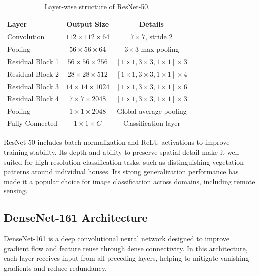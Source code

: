 \begin{table}[ht]
    \centering
    \renewcommand{\arraystretch}{1.3}
    \setlength{\tabcolsep}{10pt}
    \begin{tabular}{lcc}
        \toprule
        \textbf{Layer} & \textbf{Output Size} & \textbf{Details} \\ 
        \midrule
        Convolution      & $112 \times 112 \times 64$  & $7 \times 7$, stride 2 \\
        Pooling          & $56 \times 56 \times 64$   & $3 \times 3$ max pooling \\
        Residual Block 1 & $56 \times 56 \times 256$  & $\left[1\times1, 3\times3, 1\times1\right] \times 3$ \\
        Residual Block 2 & $28 \times 28 \times 512$  & $\left[1\times1, 3\times3, 1\times1\right] \times 4$ \\
        Residual Block 3 & $14 \times 14 \times 1024$ & $\left[1\times1, 3\times3, 1\times1\right] \times 6$ \\
        Residual Block 4 & $7 \times 7 \times 2048$   & $\left[1\times1, 3\times3, 1\times1\right] \times 3$ \\
        Pooling          & $1 \times 1 \times 2048$   & Global average pooling \\
        Fully Connected  & $1 \times 1 \times C$      & Classification layer \\
        \bottomrule
    \end{tabular}
    \caption{Layer-wise structure of ResNet-50.}
    \label{tab:resnet_layers}
\end{table}


ResNet-50 includes batch normalization and ReLU activations to improve training stability. 
Its depth and ability to preserve spatial detail make it well-suited for high-resolution 
classification tasks, such as distinguishing vegetation patterns around individual houses. 
Its strong generalization performance has made it a popular choice for image classification 
across domains, including remote sensing.


\subsection{DenseNet-161 Architecture}

DenseNet-161 \cite{huang2017densely} is a deep convolutional neural network designed 
to improve gradient flow and feature reuse through dense connectivity. In this architecture, 
each layer receives input from all preceding layers, helping to mitigate vanishing 
gradients and reduce redundancy.


